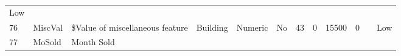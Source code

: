 \documentclass[11pt]{article}
\begin{document}
\begin{longtable}[]{@{}llllllllllll@{}}
\begin{minipage}[t]{0.04\columnwidth}
Low\strut
\end{minipage}\tabularnewline
\begin{minipage}[t]{0.04\columnwidth}\raggedright\strut
76\strut
\end{minipage} & \begin{minipage}[t]{0.04\columnwidth}\raggedright\strut
MiscVal\strut
\end{minipage} & \begin{minipage}[t]{0.04\columnwidth}\raggedright\strut
\$Value of miscellaneous feature\strut
\end{minipage} & \begin{minipage}[t]{0.04\columnwidth}\raggedright\strut
Building\strut
\end{minipage} & \begin{minipage}[t]{0.04\columnwidth}\raggedright\strut
Numeric\strut
\end{minipage} & \begin{minipage}[t]{0.04\columnwidth}\raggedright\strut
No\strut
\end{minipage} & \begin{minipage}[t]{0.04\columnwidth}\raggedright\strut
43\strut
\end{minipage} & \begin{minipage}[t]{0.04\columnwidth}\raggedright\strut
0\strut
\end{minipage} & \begin{minipage}[t]{0.04\columnwidth}\raggedright\strut
15500\strut
\end{minipage} & \begin{minipage}[t]{0.04\columnwidth}\raggedright\strut
0\strut
\end{minipage} & \begin{minipage}[t]{0.04\columnwidth}\raggedright\strut
\strut
\end{minipage} & \begin{minipage}[t]{0.04\columnwidth}\raggedright\strut
Low\strut
\end{minipage}\tabularnewline
\begin{minipage}[t]{0.04\columnwidth}\raggedright\strut
77\strut
\end{minipage} & \begin{minipage}[t]{0.04\columnwidth}\raggedright\strut
MoSold\strut
\end{minipage} & \begin{minipage}[t]{0.04\columnwidth}\raggedright\strut
Month Sold\strut
\end{minipage} & \begin{minipage}[t]{0.04\columnwidth}\raggedright\strut

\end{minipage}
\end{longtable}
\end{document}
